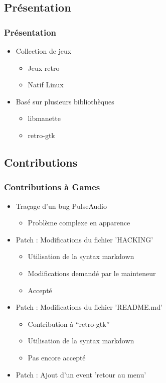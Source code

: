 \documentclass{beamer}
\begin{document}
\subsection{Présentation}
\begin{frame}
  \frametitle{Présentation}
  \begin{itemize}
  \item Collection de jeux \pause
    \begin{itemize}
    \item Jeux retro
    \item Natif Linux \pause
    \end{itemize}
  \item Basé sur plusieurs bibliothèques \pause
    \begin{itemize}
    \item libmanette
    \item retro-gtk
    \end{itemize}
  \end{itemize}
\end{frame}

\subsection{Contributions}
\begin{frame}
  \frametitle{Contributions à Games}
  \begin{itemize}
  \item Traçage d'un bug PulseAudio \pause
    \begin{itemize}
      \item Problème complexe en apparence \pause
    \end{itemize}
  \item Patch : Modifications du fichier 'HACKING' \pause
    \begin{itemize}
    \item Utilisation de la syntax markdown
    \item Modifications demandé par le mainteneur
    \item Accepté \pause
    \end{itemize}
  \item Patch : Modifications du fichier 'README.md' \pause
    \begin{itemize}
    \item Contribution à ``retro-gtk''
    \item Utilisation de la syntax markdown
    \item Pas encore accepté \pause
    \end{itemize}
  \item Patch : Ajout d'un event 'retour au menu'
  \end{itemize}
\end{frame}
\end{document}
